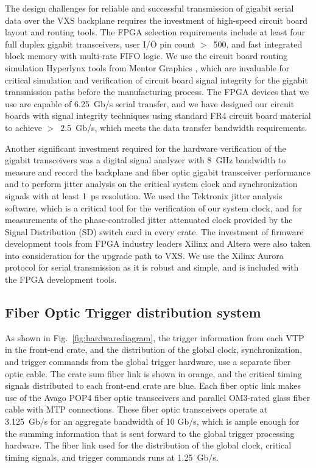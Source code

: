 The design challenges for reliable and successful transmission of gigabit serial data over the VXS backplane requires the investment of high-speed circuit board layout and routing tools.  The FPGA selection requirements include at least four full duplex gigabit transceivers, user I/O pin count $>$~500, and fast integrated block memory with multi-rate FIFO logic. We use the circuit board routing simulation Hyperlynx tools from Mentor Graphics \cite{hyperlynx-ref}, which are invaluable for critical simulation and verification of circuit board signal integrity for the gigabit transmission paths before the manufacturing process.  The FPGA devices that we use are capable of 6.25~Gb/s serial transfer, and we have designed our circuit boards with signal integrity techniques using standard FR4 circuit board material to achieve $>$~2.5~Gb/s, which meets the data transfer bandwidth requirements. 

Another significant investment required for the hardware verification of the gigabit transceivers was a digital signal analyzer with 8~GHz bandwidth to measure and record the backplane and fiber optic gigabit transceiver performance and to perform jitter analysis on the critical system clock and synchronization signals with at least 1~ps resolution.  We used the Tektronix jitter analysis software, which is a critical tool for the verification of our system clock, and for measurements of the phase-controlled jitter attenuated clock provided by the Signal Distribution (SD) switch card in every crate. The investment of firmware development tools from FPGA industry leaders Xilinx and Altera were also taken into consideration for the upgrade path to VXS. We use the Xilinx Aurora protocol for serial transmission as it is robust and simple, and is included with the FPGA development tools.  


\subsection{Fiber Optic Trigger distribution system}

As shown in Fig.~\ref{fig:hardwarediagram}, the trigger information from each VTP in the front-end crate, and the distribution of the global clock, synchronization, and trigger commands from the global trigger hardware, use a separate fiber optic cable.  The crate sum fiber link is shown in orange, and the critical timing signals distributed to each front-end crate are blue.  Each fiber optic link makes use of the Avago POP4 fiber optic transceivers and parallel OM3-rated glass fiber cable with MTP connections. These fiber optic transceivers operate at 3.125~Gb/s for an aggregate bandwidth of 10 Gb/s, which is ample enough for the summing information that is sent forward to the global trigger processing hardware.  The fiber link used for the distribution of the global clock, critical timing signals, and trigger commands runs at 1.25~Gb/s.

